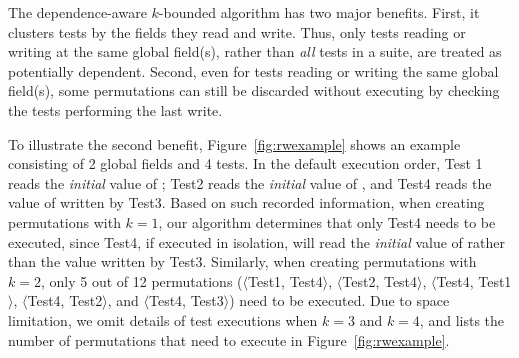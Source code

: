 The dependence-aware $k$-bounded algorithm has two major benefits.
First, it clusters tests by the fields they
read and write. Thus, only tests reading or writing at
the same global field(s), rather than \textit{all} tests
in a suite, are treated as potentially dependent.
Second, even for tests reading or writing the same global
field(s), some permutations can still be discarded
without executing by checking the tests performing the last write.


To illustrate the second benefit, Figure~\ref{fig:rwexample}
shows an example
consisting of 2 global fields and 4 tests. In the default execution
order, Test 1 reads the \textit{initial} value of ;
Test2 reads the \textit{initial} value of , and Test4
reads the value of  written by Test3.
Based on such recorded information, when creating permutations with $k=1$,
our algorithm determines that only
Test4 needs to be executed, since Test4, if executed in isolation,
will read the \textit{initial} value of  rather than the 
value written by Test3. Similarly, when creating permutations with $k=2$,
only 5 out of 12 permutations ($\langle$Test1, Test4$\rangle$,
$\langle$Test2, Test4$\rangle$, $\langle$Test4, Test1$\rangle$,
$\langle$Test4, Test2$\rangle$, and $\langle$Test4, Test3$\rangle$) need to be executed.
Due to space limitation, we omit details of test executions when
$k=3$ and $k=4$, and lists the number of permutations that need
to execute in Figure~\ref{fig:rwexample}.








